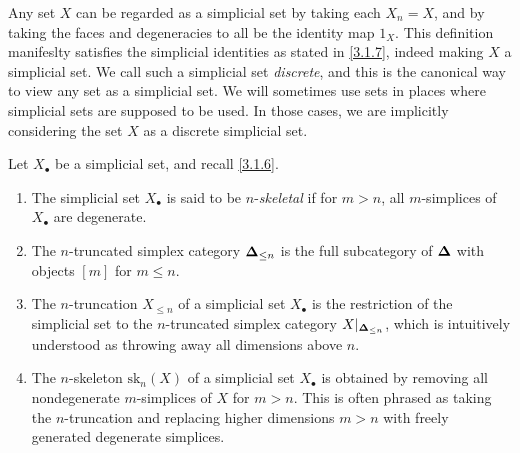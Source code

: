 \begin{example}\label{3.1.9}
    Any set $X$ can be regarded as a simplicial set by taking each $X_n=X$, and by taking the faces and degeneracies to all be the identity map $1_X$. This definition manifeslty satisfies the simplicial identities as stated in \cref{3.1.7}, indeed making $X$ a simplicial set. We call such a simplicial set \emph{discrete}, and this is the canonical way to view any set as a simplicial set. We will sometimes use sets in places where simplicial sets are supposed to be used. In those cases, we are implicitly considering the set $X$ as a discrete simplicial set.
\end{example}

\begin{definition}\label{3.1.10}
	Let $X_\bullet$ be a simplicial set, and recall \cref{3.1.6}.
    \begin{enumerate}
        \item The simplicial set $X_\bullet$ is said to be $n$-\emph{skeletal} if for $m>n$, all $m$-simplices of $X_\bullet$ are degenerate.
        \item The $n$-truncated simplex category $\boldsymbol{\Delta}_{\leq n}$ is the full subcategory of $\boldsymbol{\Delta}$ with objects $[m]$ for $m\leq n$.
        \item The $n$-truncation $X_{\leq n}$ of a simplicial set $X_\bullet$ is the restriction of the simplicial set to the $n$-truncated simplex category $X|_{\boldsymbol{\Delta}_{\leq n}}$, which is intuitively understood as throwing away all dimensions above $n$.
        \item The $n$-skeleton $\mathrm{sk}_n(X)$ of a simplicial set $X_\bullet$ is obtained by removing all nondegenerate $m$-simplices of $X$ for $m>n$. This is often phrased as taking the $n$-truncation and replacing higher dimensions $m>n$ with freely generated degenerate simplices.
    \end{enumerate}
\end{definition}
